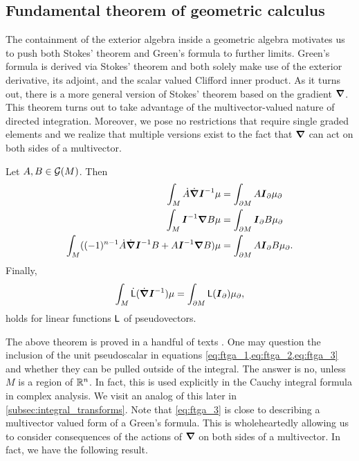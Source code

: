 \subsection{Fundamental theorem of geometric calculus}

The containment of the exterior algebra inside a geometric algebra motivates us to push both Stokes' theorem and Green's formula to further limits. Green's formula is derived via Stokes' theorem and both solely make use of the exterior derivative, its adjoint, and the scalar valued Clifford inner product. As it turns out, there is a more general version of Stokes' theorem based on the gradient $\boldsymbol{\nabla}$. This theorem turns out to take advantage of the multivector-valued nature of directed integration. Moreover, we pose no restrictions that require single graded elements and we realize that multiple versions exist to the fact that $\boldsymbol{\nabla}$ can act on both sides of a multivector.

\begin{theorem}
\label{thm:ftga}
Let $A,B\in \mathcal{G}(M)$. Then
\begin{align}
\label{eq:ftga_1}
\int_M \dot{A}\dot{\boldsymbol{\nabla}} \boldsymbol{I}^{-1} \mu &= \int_{\partial M}  A \boldsymbol{I}_\partial \mu_\partial\\
\label{eq:ftga_2}
\int_M  \boldsymbol{I}^{-1} \boldsymbol{\nabla} B \mu &= \int_{\partial M} \boldsymbol{I}_\partial B \mu_\partial\\
\label{eq:ftga_3}
\int_M ((-1)^{n-1} \dot{A}\dot{\boldsymbol{\nabla}} \boldsymbol{I}^{-1} B + A \boldsymbol{I}^{-1} \boldsymbol{\nabla} B)\mu &= \int_{\partial M} A \boldsymbol{I}_\partial B \mu_\partial.
\end{align}
Finally,
\begin{equation}
\label{eq:ftga_4}
\int_M \dot{\sf{L}}(\dot{\boldsymbol{\nabla}} \boldsymbol{I}^{-1})\mu = \int_{\partial M} \sf{L}(\boldsymbol{I}_\partial)\mu_\partial,
\end{equation}
holds for linear functions $\sf{L}$ of pseudovectors.
\end{theorem}
The above theorem is proved in a handful of texts . One may question the inclusion of the unit pseudoscalar in equations \cref{eq:ftga_1,eq:ftga_2,eq:ftga_3} and whether they can be pulled outside of the integral. The answer is no, unless $M$ is a region of $\mathbb{R}^n$. In fact, this is used explicitly in the Cauchy integral formula in complex analysis. We visit an analog of this later in \cref{subsec:integral_transforms}. Note that \cref{eq:ftga_3} is close to describing a multivector valued form of a Green's formula. This is wholeheartedly allowing us to consider consequences of the actions of $\boldsymbol{\nabla}$ on both sides of a multivector. In fact, we have the following result.

